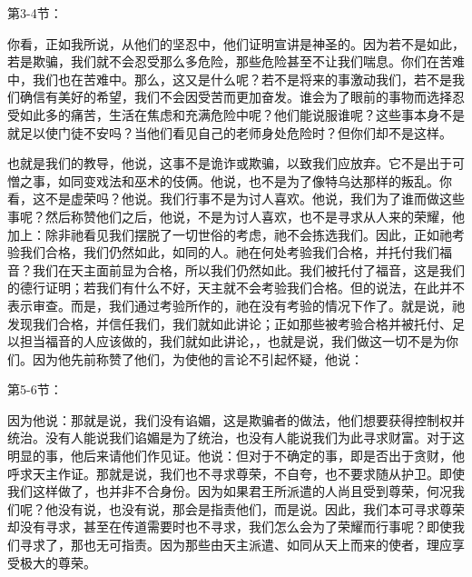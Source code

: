 第3-4节：\par

你看，正如我所说，从他们的坚忍中，他们证明宣讲是神圣的。因为若不是如此，若是欺骗，我们就不会忍受那么多危险，那些危险甚至不让我们喘息。你们在苦难中，我们也在苦难中。那么，这又是什么呢？若不是将来的事激动我们，若不是我们确信有美好的希望，我们不会因受苦而更加奋发。谁会为了眼前的事物而选择忍受如此多的痛苦，生活在焦虑和充满危险中呢？他们能说服谁呢？这些事本身不是就足以使门徒不安吗？当他们看见自己的老师身处危险时？但你们却不是这样。\par

也就是我们的教导，他说，这事不是诡诈或欺骗，以致我们应放弃。它不是出于可憎之事，如同变戏法和巫术的伎俩。他说，也不是为了像特乌达那样的叛乱。你看，这不是虚荣吗？他说。我们行事不是为讨人喜欢。他说，我们为了谁而做这些事呢？然后称赞他们之后，他说，不是为讨人喜欢，也不是寻求从人来的荣耀，他加上：除非祂看见我们摆脱了一切世俗的考虑，祂不会拣选我们。因此，正如祂考验我们合格，我们仍然如此，如同的人。祂在何处考验我们合格，并托付我们福音？我们在天主面前显为合格，所以我们仍然如此。我们被托付了福音，这是我们的德行证明；若我们有什么不好，天主就不会考验我们合格。但的说法，在此并不表示审查。而是，我们通过考验所作的，祂在没有考验的情况下作了。就是说，祂发现我们合格，并信任我们，我们就如此讲论；正如那些被考验合格并被托付、足以担当福音的人应该做的，我们就如此讲论，，也就是说，我们做这一切不是为你们。因为他先前称赞了他们，为使他的言论不引起怀疑，他说：\par

第5-6节：\par

因为他说：那就是说，我们没有谄媚，这是欺骗者的做法，他们想要获得控制权并统治。没有人能说我们谄媚是为了统治，也没有人能说我们为此寻求财富。对于这明显的事，他后来请他们作见证。他说：但对于不确定的事，即是否出于贪财，他呼求天主作证。那就是说，我们也不寻求尊荣，不自夸，也不要求随从护卫。即使我们这样做了，也并非不合身份。因为如果君王所派遣的人尚且受到尊荣，何况我们呢？他没有说，也没有说，那会是指责他们，而是说。因此，我们本可寻求尊荣却没有寻求，甚至在传道需要时也不寻求，我们怎么会为了荣耀而行事呢？即使我们寻求了，那也无可指责。因为那些由天主派遣、如同从天上而来的使者，理应享受极大的尊荣。\par


